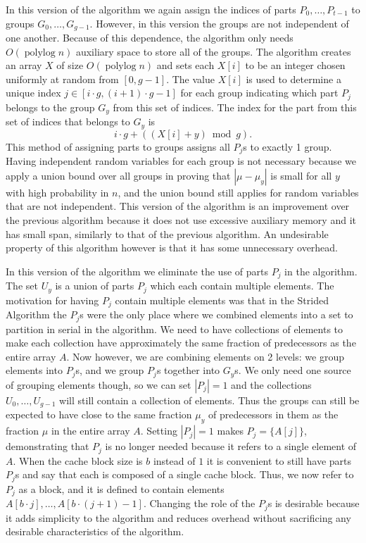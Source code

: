 \documentclass[twocolumn, twoside, 11pt]{article}
\def\polylog{\operatorname{polylog}}
\renewcommand{\paragraph}[1]{\vspace{0.09in}\noindent{\bf \boldmath #1.}}
\begin{document}
\paragraph{Version 2}
In this version of the algorithm we again assign the indices of parts $P_0,\ldots, P_{t-1}$ to groups $G_0,\ldots, G_{g-1}$.
However, in this version the groups are not independent of one another.
Because of this dependence, the algorithm only needs $O(\polylog n)$ auxiliary space to store all of the groups.
The algorithm creates an array $X$ of size $O(\polylog n)$ and sets each $X[i]$ to be an integer chosen uniformly at random from $[0,g-1]$.
The value $X[i]$ is used to determine a unique index $j \in [i\cdot g, (i+1)\cdot g-1]$ for each group indicating which part $P_j$ belongs to the group $G_y$ from this set of indices.
The index for the part from this set of indices that belongs to $G_y$ is $$i \cdot g + ((X[i]+y)\bmod g).$$ 
This method of assigning parts to groups assigns all $P_j$s to exactly 1 group.
Having independent random variables for each group is not necessary because we apply a union bound over all groups in proving that $|\mu - \mu_y|$ is small for all $y$ with high probability in $n$, and the union bound still applies for random variables that are not independent.
This version of the algorithm is an improvement over the previous algorithm because it does not use excessive auxiliary memory and it has small span, similarly to that of the previous algorithm. 
An undesirable property of this algorithm however is that it has some unnecessary overhead.

\paragraph{Version 3}
In this version of the algorithm we eliminate the use of parts $P_j$ in the algorithm.
The set $U_y$ is a union of parts $P_j$ which each contain multiple elements.
The motivation for having $P_j$ contain multiple elements was that in the Strided Algorithm the $P_j$s were the only place where we combined elements into a set to partition in serial in the algorithm.
We need to have collections of elements to make each collection have approximately the same fraction of predecessors as the entire array $A$.
Now however, we are combining elements on 2 levels: we group elements into $P_j$s, and we group $P_j$s together into $G_y$s.
We only need one source of grouping elements though, so we can set $|P_j| = 1$ and the collections $U_0,\ldots,U_{g-1}$ will still contain a collection of elements.
Thus the groups can still be expected to have close to the same fraction $\mu_y$ of predecessors in them as the fraction $\mu$ in the entire array $A$.
Setting $|P_j|=1$ makes $P_j=\{A[j]\}$, demonstrating that $P_j$ is no longer needed because it refers to a single element of $A$.
When the cache block size is $b$ instead of $1$ it is convenient to still have parts $P_j$s and say that each is composed of a single cache block.
Thus, we now refer to $P_j$ as a block, and it is defined to contain elements $A[b\cdot j],\ldots, A[b\cdot (j+1) - 1]$.
Changing the role of the $P_j$s is desirable because it adds simplicity to the algorithm and reduces overhead without sacrificing any desirable characteristics of the algorithm.
\end{document}
